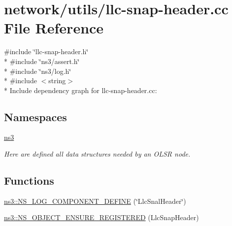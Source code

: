 \hypertarget{llc-snap-header_8cc}{}\section{network/utils/llc-\/snap-\/header.cc File Reference}
\label{llc-snap-header_8cc}
{\ttfamily \#include \char`\"{}llc-\/snap-\/header.\+h\char`\"{}}\\*
{\ttfamily \#include \char`\"{}ns3/assert.\+h\char`\"{}}\\*
{\ttfamily \#include \char`\"{}ns3/log.\+h\char`\"{}}\\*
{\ttfamily \#include $<$string$>$}\\*
Include dependency graph for llc-\/snap-\/header.cc\+:
\subsection*{Namespaces}
\begin{DoxyCompactItemize}
\item 
 \hyperlink{namespacens3}{ns3}
\begin{DoxyCompactList}\small\item\em Here are defined all data structures needed by an O\+L\+SR node. \end{DoxyCompactList}\end{DoxyCompactItemize}
\subsection*{Functions}
\begin{DoxyCompactItemize}
\item 
\hyperlink{namespacens3_ae2a9ecb67986b672542166c56dc19ca3}{ns3\+::\+N\+S\+\_\+\+L\+O\+G\+\_\+\+C\+O\+M\+P\+O\+N\+E\+N\+T\+\_\+\+D\+E\+F\+I\+NE} (\char`\"{}Llc\+Snal\+Header\char`\"{})
\item 
\hyperlink{namespacens3_aadeb8c1a8aa33a39a698645a2cef71ca}{ns3\+::\+N\+S\+\_\+\+O\+B\+J\+E\+C\+T\+\_\+\+E\+N\+S\+U\+R\+E\+\_\+\+R\+E\+G\+I\+S\+T\+E\+R\+ED} (Llc\+Snap\+Header)
\end{DoxyCompactItemize}
